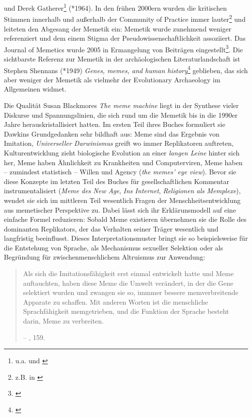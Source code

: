 \documentclass[openany,twoside,twocolumn]{book}
\let\rmarkdownfootnote\footnote%
\def\footnote{\protect\rmarkdownfootnote}
\begin{document}
und Derek Gatherer\footnote{u.a. \textcite{gatherer_identifying_2002} und \textcite{gatherer_spread_2002}} (*1964). In den frühen 2000ern wurden die kritischen Stimmen innerhalb und außerhalb der Community of Practice immer lauter\footnote{z.B. in \textcite{aunger_darwinizing_2000}} und leiteten den Abgesang der Memetik ein: Memetik wurde zunehmend weniger referenziert und dem einem Stigma der Pseudowissenschaftlichkeit assoziiert. Das Journal of Memetics wurde 2005 in Ermangelung von Beiträgen eingestellt\footnote{\textcite{vada_what_2015}}. Die sichtbarste Referenz zur Memetik in der archäologischen Literaturlandschaft ist Stephen Shennans (*1949) \emph{Genes, memes, and human history}\footnote{\textcite{shennan_genes_2002}} geblieben, das sich aber weniger der Memetik als vielmehr der Evolutionary Archaeology im Allgemeinen widmet.

Die Qualität Susan Blackmores \emph{The meme machine} liegt in der Synthese vieler Diskurse und Spannungslinien, die sich rund um die Memetik bis in die 1990er Jahre herauskristallisiert hatten. Im ersten Teil ihres Buches formuliert sie Dawkins Grundgedanken sehr bildhaft aus: Meme sind das Ergebnis von Imitation, \emph{Universeller Darwinismus} greift wo immer Replikatoren auftreten, Kulturentwicklung zieht biologische Evolution an einer \emph{langen Leine} hinter sich her, Meme haben Ähnlichkeit zu Krankheiten und Computerviren, Meme haben -- zumindest statistisch -- Willen und Agency (\emph{the memes' eye view}). Bevor sie diese Konzepte im letzten Teil des Buches für gesellschaftlichen Kommentar instrumentalisiert (\emph{Meme des New Age}, \emph{Ins Internet}, \emph{Religionen als Memplexe}), wendet sie sich im mittleren Teil wesentlich Fragen der Menschheitsentwicklung aus memetischer Perspektive zu. Dabei lässt sich ihr Erklärunsmodell auf eine einfache Formel reduzieren: Sobald Meme existieren übernehmen sie die Rolle des dominanten Replikators, der das Verhalten seiner Träger wesentlich und langfristig beeinflusst. Dieses Interpretationsmuster bringt sie so beispielsweise für die Entstehung von Sprache, als Mechanismus sexueller Selektion oder als Begründung für zwischenmenschlichem Altruismus zur Anwendung:

\begin{quote}
Als sich die Imitationsfähigkeit erst einmal entwickelt hatte und Meme auftauchten, haben diese Meme die Umwelt verändert, in der die Gene selektiert wurden und zwangen sie so, immmer bessere memverbreitende Apparate zu schaffen. Mit anderen Worten ist die menschliche Sprachfähigkeit memgetrieben, und die Funktion der Sprache besteht darin, Meme zu verbreiten.

-- \textcite{blackmore_macht_2000}, 159.
\end{quote}
\end{document}
